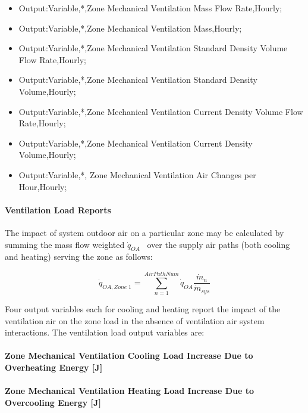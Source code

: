 \begin{itemize}
\item
  Output:Variable,*,Zone Mechanical Ventilation Mass Flow Rate,Hourly;
\item
  Output:Variable,*,Zone Mechanical Ventilation Mass,Hourly;
\item
  Output:Variable,*,Zone Mechanical Ventilation Standard Density Volume Flow Rate,Hourly;
\item
  Output:Variable,*,Zone Mechanical Ventilation Standard Density Volume,Hourly;
\item
  Output:Variable,*,Zone Mechanical Ventilation Current Density Volume Flow Rate,Hourly;
\item
  Output:Variable,*,Zone Mechanical Ventilation Current Density Volume,Hourly;
\item
  Output:Variable,*, Zone Mechanical Ventilation Air Changes per Hour,Hourly;
\end{itemize}

\paragraph{Ventilation Load Reports}\label{ventilation-load-reports}

The impact of system outdoor air on a particular zone may be calculated by summing the mass flow weighted \({\dot q_{OA}}\) ~over the supply air paths (both cooling and heating) serving the zone as follows:

\begin{equation}
{\dot q_{OA,Zone\;1}} = \sum\limits_{n = 1}^{AirPathNum} {{{\dot q}_{OA}}\frac{{{{\dot m}_n}}}{{{{\dot m}_{sys}}}}}
\end{equation}

Four output variables each for cooling and heating report the impact of the ventilation air on the zone load in the absence of ventilation air system interactions. The ventilation load output variables are:

\paragraph{Zone Mechanical Ventilation Cooling Load Increase Due to Overheating Energy {[}J{]}}\label{zone-mechanical-ventilation-cooling-load-increase-due-to-overheating-energy-j}

\paragraph{Zone Mechanical Ventilation Heating Load Increase Due to Overcooling Energy {[}J{]}}\label{zone-mechanical-ventilation-heating-load-increase-due-to-overcooling-energy-j}


